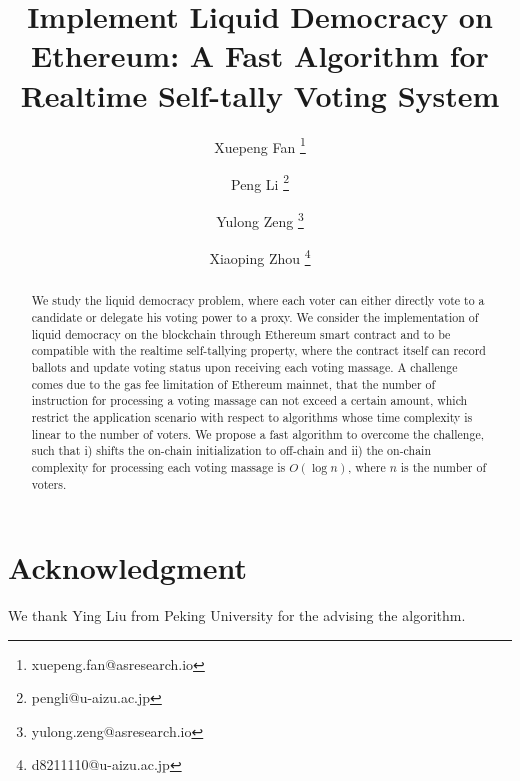 \documentclass[12pt]{article}
\begin{document}
	\pagestyle{empty}

	\title{Implement Liquid Democracy on Ethereum: A Fast Algorithm for Realtime Self-tally Voting System}
\author[1]{Xuepeng Fan \thanks{xuepeng.fan@asresearch.io}}
\author[2]{Peng Li \thanks{pengli@u-aizu.ac.jp}}
\author[1]{Yulong Zeng \thanks{yulong.zeng@asresearch.io}}
\author[2]{Xiaoping Zhou \thanks{d8211110@u-aizu.ac.jp}}

\maketitle
\begin{abstract}
	We study the liquid democracy problem, where each voter can either directly vote to a candidate or delegate his voting power to a proxy. We consider the implementation of liquid democracy on the blockchain through Ethereum smart contract and to be compatible with the realtime self-tallying property, where the contract itself can record  ballots and update voting status upon receiving each voting massage.  A challenge comes due to the gas fee limitation of Ethereum mainnet, that the number of instruction for processing a voting massage can not exceed a certain amount, which restrict the application scenario with respect to algorithms whose time complexity is linear to the number of voters. We propose a fast algorithm to overcome the challenge, such that i) shifts the on-chain initialization to off-chain and ii) the on-chain complexity for processing each voting massage is $O(\log n)$, where $n$ is the number of voters. %
\end{abstract}







\section*{Acknowledgment}
We thank Ying Liu from Peking University for the advising the algorithm.



\end{document}
